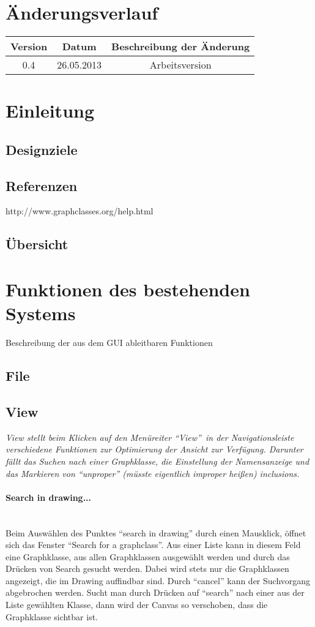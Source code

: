 \documentclass[10pt,a4paper]{article}
\begin{document}
\section{Änderungsverlauf}
\begin{tabular}{|c|c|c|}\hline
 \textbf{Version}&\textbf{Datum}&\textbf{Beschreibung der \"Anderung}\\\hline
 0.4&26.05.2013&Arbeitsversion\\\hline
\end{tabular}
\section{Einleitung}
\subsection{Designziele}

\subsection{Referenzen}
http://www.graphclasses.org/help.html

\subsection{Übersicht}  
\section{Funktionen des bestehenden Systems}
Beschreibung der aus dem GUI ableitbaren Funktionen
\subsection{File}
\subsection{View}
\emph{View stellt beim Klicken auf den Menüreiter "`View"'\ in der Navigationsleiste verschiedene Funktionen zur Optimierung der Ansicht zur Verfügung. Darunter fällt das Suchen nach einer Graphklasse, die Einstellung der Namensanzeige und das Markieren von "`unproper"' (müsste eigentlich improper heißen) inclusions.}\\

\paragraph{Search in drawing...}\ \\
Beim Auswählen des Punktes "`search in drawing"' durch einen Mausklick, öffnet sich das Fenster "`Search for a graphclass"'. Aus einer Liste kann in diesem Feld eine Graphklasse, aus allen Graphklassen ausgewählt werden und durch das Drücken von Search gesucht werden. Dabei wird stets nur die Graphklassen angezeigt, die im Drawing auffindbar sind. Durch "`cancel"' kann der Suchvorgang abgebrochen werden. Sucht man durch Drücken auf "`search"' nach einer aus der Liste gewählten Klasse, dann wird der Canvas so verschoben, dass die Graphklasse sichtbar ist.
\end{document}
